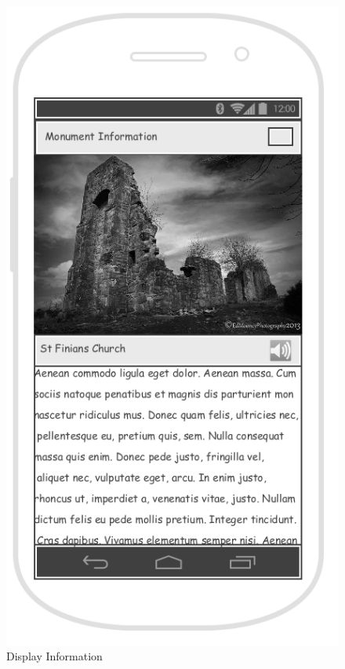 \begin{figure}[!tbp]
    \centering
    \begin{minipage}[b]{0.4\textwidth}
        \includegraphics[width=\textwidth]{DisplayInformationWireframe}
        \caption{Display Information }
        \label{Figure: Display Information }
    \end{minipage}

\end{figure}
